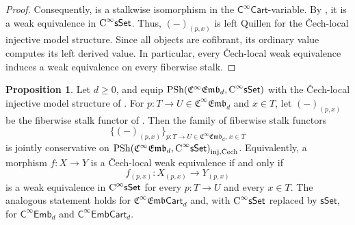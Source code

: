 \documentclass{amsart}
\newcommand{\cat}[1]{\mathsf{#1}}
\newcommand{\sset}{\cat{sSet}}
\newcommand{\inj}{\textnormal{inj}}
\newcommand{\Cech}{\textnormal{\v{C}ech}}
\newcommand{\CsSet}{\textnormal{C}^{\infty}\sset}
\newcommand{\Cart}{\cat{C}^{\infty}\cat{Cart}}
\newcommand{\fembnoniso}[1]{\cat{C}^{\infty}\cat{Emb}_{#1}}
\newcommand{\fembcartnoniso}[1]{\cat{C}^{\infty}\cat{EmbCart}_{#1}}
\newcommand{\femb}[1]{\mathfrak{C}^{\infty}\mathfrak{Emb}_{#1}}
\newcommand{\fembcart}[1]{\mathfrak{C}^{\infty}\mathfrak{Emb}\cat{Cart}_{#1}}
\newcommand{\psh}{\mathrm{PSh}}
\theoremstyle{definition}
\newtheorem{proposition}[equation]{Proposition}
\numberwithin{equation}{subsection}
\numberwithin{subsubsection}{subsection}
\begin{document}
\begin{proof}
  Consequently,
   is a stalkwise
  isomorphism in the \(\Cart\)-variable. By
  \cite[Proposition~12.5]{PavlovSmoothOka}, it is a weak equivalence in
  \(\CsSet\). Thus, \((- )_{(p,x)}\) is left Quillen for the \v{C}ech-local
  injective model
  structure. Since all objects are cofibrant, its ordinary value computes its
  left derived value. In particular, every \v{C}ech-local weak equivalence
  induces a weak equivalence on every fiberwise stalk.
\end{proof}

\begin{proposition}\label{prop:femb.stalks.detect.local.we}
  Let \(d\geq0\), and equip \(\psh(\femb{d},\CsSet)\) with the
  \v{C}ech-local injective model structure of
  . For \(p:T\to U\in\femb{d}\)
  and \(x\in T\), let \((- )_{(p,x)}\) be the fiberwise stalk functor of
  . Then the family of fiberwise stalk
  functors
  \[
    \bigl\{(-)_{(p,x)}\bigr\}_{p:T\to U\in\femb{d},\,x\in T}
  \]
  is jointly conservative on
  \(\psh(\femb{d},\CsSet)_{\inj,\Cech}\). Equivalently, a morphism
  \(f:X\to Y\) is a \v{C}ech-local weak equivalence if and only if
  \[
    f_{(p,x)}:X_{(p,x)}\longrightarrow Y_{(p,x)}
  \]
  is a weak equivalence in \(\CsSet\) for every \(p:T\to U\) and every
  \(x\in T\). The analogous statement holds for \(\fembcart{d}\) and, with
  \(\CsSet\) replaced by \(\sset\), for \(\fembnoniso{d}\) and
  \(\fembcartnoniso{d}\).
\end{proposition}
\end{document}
